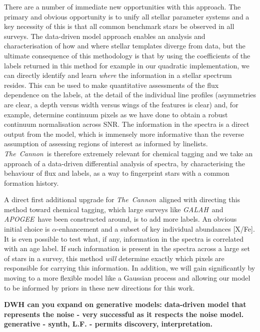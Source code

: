 \documentclass[12pt, preprint]{aastex}
\newcommand{\tc}{\textsl{The~Cannon}}
\newcommand{\apogee}{\textsl{APOGEE}}
\newcommand{\galah}{\textsl{GALAH}}
\begin{document}
There are a number of immediate new opportunities with this approach. The primary and obvious opportunity is to unify all stellar parameter systems and a key necessity of this is that all common benchmark stars be observed in all surveys. The data-driven model approach enables an analysis and characterisation of how and where stellar templates diverge from data, but the ultimate consequence of this methodology is that by using the coefficients of the labels returned in this method for example in our quadratic implementation, we can directly identify and learn \textit{where} the information in a stellar spectrum resides. This can be used to make quantitative assessments of the flux dependence on the labels, at the detail of the individual line profiles (asymmetries are clear, a depth versus width versus wings of the features is clear) and, for example, determine continuum pixels as we have done to obtain a robust continuum normalisation across SNR. The information in the spectra  is a direct output from the model, which is immensely more informative than the reverse assumption of assessing regions of interest as informed by linelists.  \tc\ is therefore extremely relevant for chemical tagging and we take an approach of a data-driven differential analysis of spectra, by characterising the behaviour of flux and labels, as a way to fingerprint stars with a common formation history.

A direct first additional upgrade for \tc\ aligned with directing this method toward chemical tagging, which large surveys like \galah\ and \apogee\ have been constructed around,  is  to add more labels. An obvious initial choice is $\alpha$-enhancement and a subset of key individual abundances [X/Fe]. It is even possible to test what, if any, information in the spectra is correlated with an age label. If such information is present in the spectra across a large set of stars in a survey, this method \textit{will} determine exactly which pixels are responsible for carrying this information. In addition, we will gain significantly by moving to a more flexible model like a Gaussian process and allowing our model to be informed by priors in these new directions for this work. 


\textbf{DWH can you expand on generative models: data-driven model that represents the noise -  very successful as it respects the noise model. generative - synth, L.F. - permits discovery, interpretation.}



\end{document}

